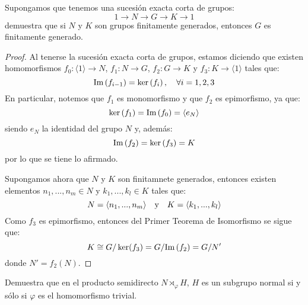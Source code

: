 \documentclass[12pt]{report}
\newcounter{it}
\theoremstyle{largebreak}
\newcommand\cf[3]{\ensuremath{#1:#2\rightarrow#3}}
\newcommand{\gen}[1]{\ensuremath{\langle#1\rangle}}
\newcommand{\im}[1]{\ensuremath{\textup{Im}\left(#1\right)}}
\begin{document}
    \begin{excer}
        Supongamos que tenemos una sucesión exacta corta de grupos:
        \begin{equation*}
            1\rightarrow N\rightarrow G\rightarrow K\rightarrow 1
        \end{equation*}
        demuestra que si $N$ y $K$ son grupos finitamente generados, entonces $G$ es finitamente generado.
    \end{excer}

    \begin{proof}
        Al tenerse la sucesión exacta corta de grupos, estamos diciendo que existen homomorfismos $\cf{f_0}{\gen{1}}{N}$, $\cf{f_1}{N}{G}$, $\cf{f_2}{G}{K}$ y $\cf{f_3}{K}{\gen{1}}$ tales que:
        \begin{equation*}
            \im{f_{i-1}}=\ker\left(f_i \right),\quad\forall i=1,2,3
        \end{equation*}
        En particular, notemos que $f_1$ es monomorfismo y que $f_2$ es epimorfismo, ya que:
        \begin{equation*}
            \ker\left(f_1\right)=\im{f_0}=\gen{e_N}
        \end{equation*}
        siendo $e_N$ la identidad del grupo $N$ y, además:
        \begin{equation*}
            \im{f_2}=\ker\left(f_3\right)=K
        \end{equation*}
        por lo que se tiene lo afirmado.

        Supongamos ahora que $N$ y $K$ son finitamnete generados, entonces existen elementos $n_1,...,n_m\in N$ y $k_1,...,k_l\in K$ tales que:
        \begin{equation*}
            N=\gen{n_1,...,n_m}\quad\textup{y}\quad K=\gen{k_1,...,k_l}
        \end{equation*}
        Como $f_3$ es epimorfismo, entonces del Primer Teorema de Isomorfismo se sigue que:
        \begin{equation*}
            K\cong G/\ker(f_3)=G/\im{f_2}=G/N'
        \end{equation*}
        donde $N'=f_2(N)$.
        
    \end{proof}

    \begin{excer}
        Demuestra que en el producto semidirecto $N\rtimes_{\varphi}H$, $H$ es un subgrupo normal si y sólo si $\varphi$ es el homomorfismo trivial.
    \end{excer}
\end{document}

